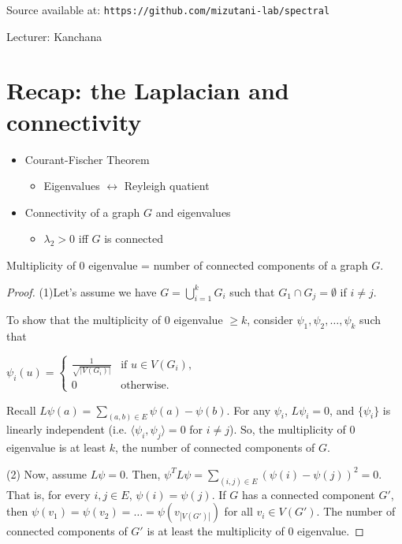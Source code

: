 \documentclass[11pt,letterpaper]{article}
\begin{document}
Source available at: \texttt{https://github.com/mizutani-lab/spectral}

Lecturer: Kanchana

\section{Recap: the Laplacian and connectivity}

\begin{itemize}
    \item Courant-Fischer Theorem
    \begin{itemize}
        \item Eigenvalues $\leftrightarrow$ Reyleigh quatient
    \end{itemize}
    \item Connectivity of a graph $G$ and eigenvalues
    \begin{itemize}
        \item $\lambda_2 > 0$ iff $G$ is connected
    \end{itemize}
    
\end{itemize}

\begin{theorem}\label{thm:connected}
    Multiplicity of 0 eigenvalue = number of connected components of a graph $G$.
\end{theorem}

\begin{proof}
    (1)Let's assume we have $G = \bigcup_{i=1}^k G_i$ such that
    $G_1 \cap G_j = \emptyset$ if $i \neq j$.

    To show that the multiplicity of 0 eigenvalue $\geq k$,
    consider $\psi_1,\psi_2,\dots,\psi_k$ such that

    $\psi_i(u) = \begin{cases}
        \frac{1}{\sqrt{|V(G_i)|}} &\text{if } u \in V(G_i),\\
        0&\text{otherwise}.
    \end{cases}$

    Recall $L\psi(a)=\sum_{(a,b)\in E}\psi(a) - \psi(b)$.
    For any $\psi_i$, $L\psi_i=0$, and $\{\psi_i\}$ is linearly independent (i.e. $\langle \psi_i, \psi_j \rangle=0$ for $i \neq j$).
    So, the multiplicity of 0 eigenvalue is at least $k$, the number of connected components of $G$.

    (2)
    Now, assume $L \psi = 0$.
    Then, $\psi^T L \psi = \sum_{(i,j)\in E} \left(\psi(i) - \psi(j)\right)^2=0$.
    That is, for every $i,j \in E$, $\psi(i)=\psi(j)$.
%
    If $G$ has a connected component $G'$, then $\psi(v_1)=\psi(v_2)=\ldots=\psi(v_{|V(G')|})$ for all $v_i \in V(G')$.
    The number of connected components of $G'$ is at least the multiplicity of 0 eigenvalue.
\end{proof}
\end{document}
